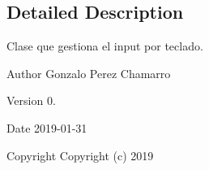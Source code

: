 \subsection{Detailed Description}
Clase que gestiona el input por teclado. 

\begin{DoxyAuthor}{Author}
Gonzalo Perez Chamarro 
\end{DoxyAuthor}
\begin{DoxyVersion}{Version}
0. 
\end{DoxyVersion}
\begin{DoxyDate}{Date}
2019-\/01-\/31
\end{DoxyDate}
\begin{DoxyCopyright}{Copyright}
Copyright (c) 2019 
\end{DoxyCopyright}
